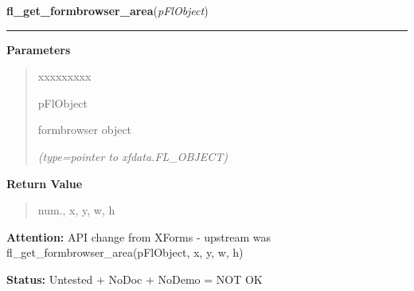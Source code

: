 \hspace{.8\funcindent}\begin{boxedminipage}{\funcwidth}

    \raggedright \textbf{fl\_get\_formbrowser\_area}(\textit{pFlObject})

    \vspace{-1.5ex}

    \rule{\textwidth}{0.5\fboxrule}
\setlength{\parskip}{2ex}
\setlength{\parskip}{1ex}
      \textbf{Parameters}
      \vspace{-1ex}

      \begin{quote}
        \begin{Ventry}{xxxxxxxxx}

          \item[pFlObject]

          formbrowser object

            {\it (type=pointer to xfdata.FL\_OBJECT)}

        \end{Ventry}

      \end{quote}

      \textbf{Return Value}
    \vspace{-1ex}

      \begin{quote}
      num., x, y, w, h

      \end{quote}

\textbf{Attention:} API change from XForms - upstream was fl\_get\_formbrowser\_area(pFlObject,
x, y, w, h)



\textbf{Status:} Untested + NoDoc + NoDemo = NOT OK



    \end{boxedminipage}

    \label{xformslib:flformbrowser:fl_set_formbrowser_scroll}

    \vspace{0.5ex}

